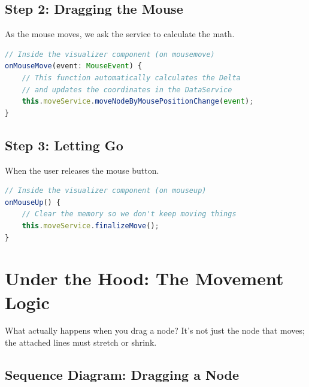 \documentclass[a4paper,11pt,oneside]{report}
\begin{document}
\subsection{Step 2: Dragging the Mouse}

As the mouse moves, we ask the service to calculate the math.

\begin{lstlisting}[language=TypeScript]
// Inside the visualizer component (on mousemove)
onMouseMove(event: MouseEvent) {
    // This function automatically calculates the Delta
    // and updates the coordinates in the DataService
    this.moveService.moveNodeByMousePositionChange(event);
}
\end{lstlisting}

\subsection{Step 3: Letting Go}

When the user releases the mouse button.

\begin{lstlisting}[language=TypeScript]
// Inside the visualizer component (on mouseup)
onMouseUp() {
    // Clear the memory so we don't keep moving things
    this.moveService.finalizeMove();
}
\end{lstlisting}

\section{Under the Hood: The Movement Logic}

What actually happens when you drag a node? It's not just the node that moves; the attached lines must stretch or shrink.

\subsection{Sequence Diagram: Dragging a Node}

%
%
%     
%     
%     
\end{document}
